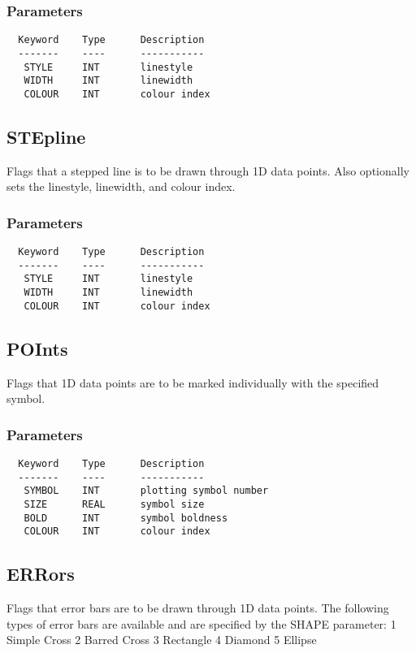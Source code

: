 \documentclass{book}
\renewcommand{\_}{{\tt\char'137}}     %
\begin{document}
\subsubsection{Parameters}
\begin{verbatim}
  Keyword    Type      Description
  -------    ----      -----------
   STYLE     INT       linestyle
   WIDTH     INT       linewidth
   COLOUR    INT       colour index
\end{verbatim}\subsection{STEpline}
Flags that a stepped line is to be drawn through 1D data points.
Also optionally sets the linestyle, linewidth, and
colour index.

\subsubsection{Parameters}
\begin{verbatim}
  Keyword    Type      Description
  -------    ----      -----------
   STYLE     INT       linestyle
   WIDTH     INT       linewidth
   COLOUR    INT       colour index
\end{verbatim}\subsection{POInts}
Flags that 1D data points are to be marked individually
with the specified symbol.
\subsubsection{Parameters}
\begin{verbatim}
  Keyword    Type      Description
  -------    ----      -----------
   SYMBOL    INT       plotting symbol number
   SIZE      REAL      symbol size
   BOLD      INT       symbol boldness
   COLOUR    INT       colour index
\end{verbatim}\subsection{ERRors}
Flags that error bars are to be drawn through 1D data points.
The following types of error bars are available and are
specified by the SHAPE parameter:
1 Simple Cross 2 Barred Cross
3 Rectangle 4 Diamond
5 Ellipse
\end{document}

